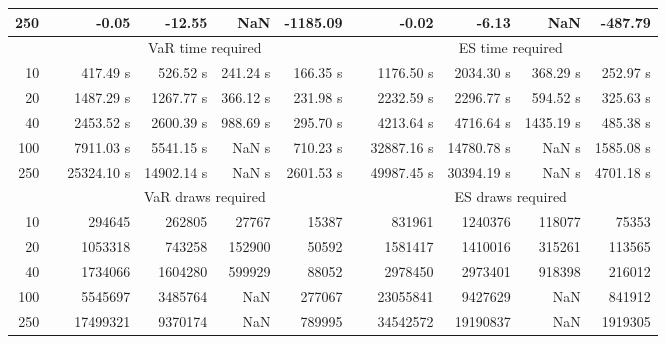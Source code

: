 {{\begin{longtable}{rr rrrr r rrrr}
250 && -0.05 & -12.55 &  NaN & -1185.09 && -0.02 & -6.13 &  NaN & -487.79 \\ 
\hline 
 & & \multicolumn{4}{c}{VaR time required} && \multicolumn{4}{c}{ES time required} \\ \cline{3-6}  \cline{8-11}
10 & & 417.49 s & 526.52 s & 241.24 s & 166.35 s && 1176.50 s & 2034.30 s & 368.29 s & 252.97 s \\ 
20 & & 1487.29 s & 1267.77 s & 366.12 s & 231.98 s && 2232.59 s & 2296.77 s & 594.52 s & 325.63 s \\ 
40 & & 2453.52 s & 2600.39 s & 988.69 s & 295.70 s && 4213.64 s & 4716.64 s & 1435.19 s & 485.38 s \\ 
100 & & 7911.03 s & 5541.15 s &  NaN s & 710.23 s && 32887.16 s & 14780.78 s &  NaN s & 1585.08 s \\ 
250 & & 25324.10 s & 14902.14 s &  NaN s & 2601.53 s && 49987.45 s & 30394.19 s &  NaN s & 4701.18 s \\ 
\hline 
 && \multicolumn{4}{c}{VaR draws required} &&   \multicolumn{4}{c}{ES draws required} \\  \cline{3-6}  \cline{8-11} 
10 & & 294645 & 262805 & 27767 & 15387 && 831961 & 1240376 & 118077  & 75353 \\ 
20 & & 1053318 & 743258 & 152900 & 50592 && 1581417 & 1410016 & 315261  & 113565 \\ 
40 & & 1734066 & 1604280 & 599929 & 88052 && 2978450 & 2973401 & 918398  & 216012 \\ 
100 & & 5545697 & 3485764 & NaN & 277067 && 23055841 & 9427629 & NaN  & 841912 \\ 
250 & & 17499321 & 9370174 & NaN & 789995 && 34542572 & 19190837 & NaN  & 1919305 \\ 
\hline 
\end{longtable} 
} 
} 
